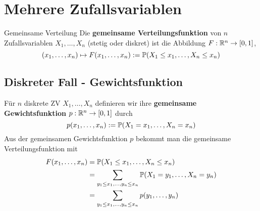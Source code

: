 \section{Mehrere Zufallsvariablen}
\begin{mainbox}{Gemeinsame Verteilung}
    Die \textbf{gemeinsame Verteilungsfunktion} von $n$ Zufallsvariablen $X_1, \ldots, X_n$ (stetig oder diskret) ist die Abbildung $F: \R^n \to [0,1]$,
    $$(x_1, \ldots, x_n) \mapsto F(x_1, \ldots, x_n) := \P(X_1 \leq x_1, \ldots, X_n \leq x_n)$$
\end{mainbox}
\subsection{Diskreter Fall - Gewichtsfunktion}
    Für $n$ diskrete ZV $X_1, \ldots, X_n$ definieren wir ihre \textbf{gemeinsame Gewichtsfunktion} $p: \R^n \to [0,1]$ durch
    $$p(x_1, \ldots, x_n) := \P(X_1 = x_1, \ldots, X_n = x_n)$$
    Aus der gemeinsamen Gewichtsfunktion $p$ bekommt man die gemeinsame Verteilungsfunktion mit
    \begin{align*}
        F(x_1, \ldots, x_n) &= \P(X_1 \leq x_1, \ldots, X_n \leq x_n)\\
        &= \sum_{y_1 \leq x_1, \ldots, y_n \leq x_n}\P(X_1 = y_1, \ldots, X_n = y_n)\\
        &= \sum_{y_1 \leq x_1, \ldots, y_n \leq x_n}p(y_1, \ldots,y_n)
    \end{align*}    


